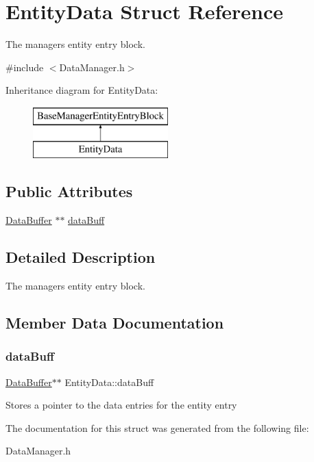 \hypertarget{struct_entity_data}{}\section{Entity\+Data Struct Reference}
\label{struct_entity_data}


The managers entity entry block.  




{\ttfamily \#include $<$Data\+Manager.\+h$>$}

Inheritance diagram for Entity\+Data\+:\begin{figure}[H]
\begin{center}
\leavevmode
\includegraphics[height=2.000000cm]{struct_entity_data}
\end{center}
\end{figure}
\subsection*{Public Attributes}
\begin{DoxyCompactItemize}
\item 
\hyperlink{struct_data_buffer}{Data\+Buffer} $\ast$$\ast$ \hyperlink{struct_entity_data_a3debeec6a2ef1d015775b21c6aae3bc2}{data\+Buff}
\end{DoxyCompactItemize}


\subsection{Detailed Description}
The managers entity entry block. 

\subsection{Member Data Documentation}
\mbox{\label{struct_entity_data_a3debeec6a2ef1d015775b21c6aae3bc2}} 
\subsubsection{\texorpdfstring{data\+Buff}{dataBuff}}
{\footnotesize\ttfamily \hyperlink{struct_data_buffer}{Data\+Buffer}$\ast$$\ast$ Entity\+Data\+::data\+Buff}

Stores a pointer to the data entries for the entity entry 

The documentation for this struct was generated from the following file\+:\begin{DoxyCompactItemize}
\item 
Data\+Manager.\+h\end{DoxyCompactItemize}
